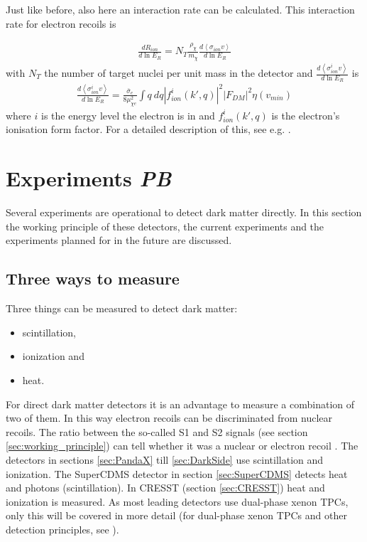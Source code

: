 \documentclass{article}
\begin{document}
Just like before, also here an interaction rate can be calculated. This interaction rate for electron recoils is

\begin{align}
    \frac{dR_{ion}}{d\ln E_R} = N_T \frac{\rho_\chi}{m_\chi} \frac{d\left<\sigma_{ion}v\right>}{d\ln E_R}
\end{align}
with $N_T$ the number of target nuclei per unit mass in the detector and $\frac{d\left<\sigma_{ion}^iv\right>}{d\ln E_R}$ is
\begin{align}
    \frac{d\left<\sigma_{ion}^iv\right>}{d\ln E_R} = \frac{\bar{\sigma}_e}{8\mu^2_{\chi e}}\int q\ dq \left| f_{ion}^i(k',q) \right|^2 \left|F_{DM}\right|^2 \eta (v_{min})
\end{align}
where $i$ is the energy level the electron is in and $f_{ion}^i(k',q)$ is the electron's ionisation form factor. For a detailed description of this, see e.g. \cite{Essig:2011nj}.
 
\FloatBarrier
\newpage
\section{Experiments \small{\textit{PB}}}

Several experiments are operational to detect dark matter directly. In this section the working principle of these detectors, the current experiments and the experiments planned for in the future are discussed.

\subsection{Three ways to measure}
Three things can be measured to detect dark matter:
\begin{itemize}
    \item scintillation,
    \item ionization and
    \item heat.
\end{itemize}
For direct dark matter detectors it is an advantage to measure a combination of two of them. In this way electron recoils can be discriminated from nuclear recoils. The ratio between the so-called S1 and S2 signals (see section \ref{sec:working_principle}) can tell whether it was a nuclear or electron recoil \cite{Aprile:2009dv}. The detectors in sections \ref{sec:PandaX} till \ref{sec:DarkSide} use scintillation and ionization. The SuperCDMS detector in section \ref{sec:SuperCDMS} detects heat and photons (scintillation). In CRESST (section \ref{sec:CRESST}) heat and ionization is measured. As most leading detectors use dual-phase xenon TPCs, only this will be covered in more detail (for dual-phase xenon TPCs and other detection principles, see \cite{Aprile:2009dv}).
\end{document}
